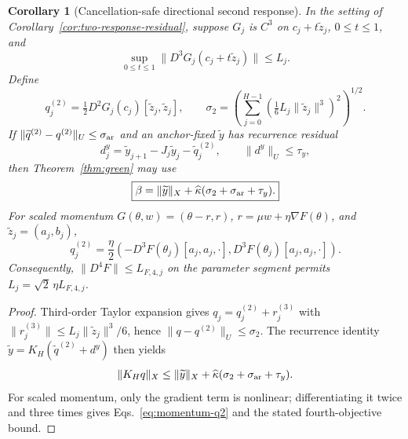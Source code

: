 \documentclass{article}
\newtheorem{corollary}{Corollary}
\begin{document}
\begin{corollary}[Cancellation-safe directional second response]
\label{cor:directional-two-response}
In the setting of Corollary~\ref{cor:two-response-residual}, suppose $G_j$ is
$C^3$ on $c_j+t\widetilde z_j$, $0\le t\le1$, and
\begin{equation}
 \sup_{0\le t\le1}\|D^3G_j(c_j+t\widetilde z_j)\|\le L_j.
\end{equation}
Define
\begin{equation}
 q^{(2)}_j=\tfrac12D^2G_j(c_j)
 [\widetilde z_j,\widetilde z_j],\qquad
 \sigma_2=
 \left(\sum_{j=0}^{H-1}
 \left(\tfrac16L_j\|\widetilde z_j\|^3\right)^2\right)^{1/2}.
 \label{eq:directional-q2}
\end{equation}
If $\|\widetilde q^{(2)}-q^{(2)}\|_U\le\sigma_{\rm ar}$ and an
anchor-fixed $\widetilde y$ has recurrence residual
\begin{equation}
 d^y_j=\widetilde y_{j+1}-J_j\widetilde y_j-
 \widetilde q^{(2)}_j,\qquad \|d^y\|_U\le\tau_y,
\end{equation}
then Theorem~\ref{thm:green} may use
\begin{equation}
 \boxed{\beta=\|\widetilde y\|_X+
 \widehat\kappa(\sigma_2+\sigma_{\rm ar}+\tau_y).}
 \label{eq:directional-two-response}
\end{equation}
For scaled momentum
$G(\theta,w)=(\theta-r,r)$,
$r=\mu w+\eta\nabla F(\theta)$, and
$\widetilde z_j=(a_j,b_j)$,
\begin{equation}
 q^{(2)}_j=\frac{\eta}{2}
 \left(-D^3F(\theta_j)[a_j,a_j,\cdot],
        D^3F(\theta_j)[a_j,a_j,\cdot]\right).
 \label{eq:momentum-q2}
\end{equation}
Consequently, $\|D^4F\|\le L_{F,4,j}$ on the parameter segment permits
$L_j=\sqrt2\,\eta L_{F,4,j}$.
\end{corollary}

\begin{proof}
Third-order Taylor expansion gives
$q_j=q^{(2)}_j+r^{(3)}_j$ with
$\|r^{(3)}_j\|\le L_j\|\widetilde z_j\|^3/6$, hence
$\|q-q^{(2)}\|_U\le\sigma_2$.  The recurrence identity
$\widetilde y=K_H(\widetilde q^{(2)}+d^y)$ then yields
\begin{equation}
 \|K_Hq\|_X\le\|\widetilde y\|_X+
 \widehat\kappa(\sigma_2+\sigma_{\rm ar}+\tau_y).
\end{equation}
For scaled momentum, only the gradient term is nonlinear; differentiating it
twice and three times gives Eqs.~\eqref{eq:momentum-q2} and the stated
fourth-objective bound.
\end{proof}
\end{document}
